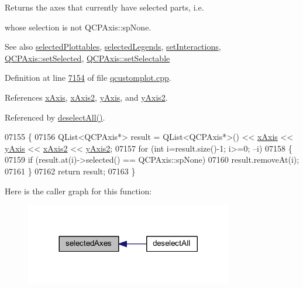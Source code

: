 Returns the axes that currently have selected parts, i.\+e. 

whose selection is not Q\+C\+P\+Axis\+::sp\+None.

\begin{DoxySeeAlso}{See also}
\hyperlink{a00116_a6721b8c689bb7f2f400987e580508fe8}{selected\+Plottables}, \hyperlink{a00116_a1ea6297300c3e2770e65f95836411755}{selected\+Legends}, \hyperlink{a00116_add9cc886ff5257f64fb4117cf6c135fe}{set\+Interactions}, \hyperlink{a00025_a24c13908da2f8d629b1bbbe9cbd63e39}{Q\+C\+P\+Axis\+::set\+Selected}, \hyperlink{a00025_afa988209bf6519f63d6ef2e615dbe1ea}{Q\+C\+P\+Axis\+::set\+Selectable} 
\end{DoxySeeAlso}


Definition at line \hyperlink{a00115_source_l07154}{7154} of file \hyperlink{a00115_source}{qcustomplot.\+cpp}.



References \hyperlink{a00116_source_l02076}{x\+Axis}, \hyperlink{a00116_source_l02076}{x\+Axis2}, \hyperlink{a00116_source_l02076}{y\+Axis}, and \hyperlink{a00116_source_l02076}{y\+Axis2}.



Referenced by \hyperlink{a00115_source_l07189}{deselect\+All()}.


\begin{DoxyCode}
07155 \{
07156   QList<QCPAxis*> result = QList<QCPAxis*>() << \hyperlink{a00116_a384438707adbcc96b0fa1324106f7129}{xAxis} << \hyperlink{a00116_af168096ce67002b1fbce18ae5dd1b652}{yAxis} << 
      \hyperlink{a00116_a058f6d3a4c86bf94c476e5c380711dba}{xAxis2} << \hyperlink{a00116_a4fd6679232da7da0a1ae4e1b6ae83d6e}{yAxis2};
07157   \textcolor{keywordflow}{for} (\textcolor{keywordtype}{int} i=result.size()-1; i>=0; --i)
07158   \{
07159     \textcolor{keywordflow}{if} (result.at(i)->selected() == QCPAxis::spNone)
07160       result.removeAt(i);
07161   \}
07162   \textcolor{keywordflow}{return} result;
07163 \}
\end{DoxyCode}


Here is the caller graph for this function\+:
\nopagebreak
\begin{figure}[H]
\begin{center}
\leavevmode
\includegraphics[width=257pt]{d4/d3e/a00116_aa6baf867e8beb96ed5bd471f83ece903_icgraph}
\end{center}
\end{figure}


